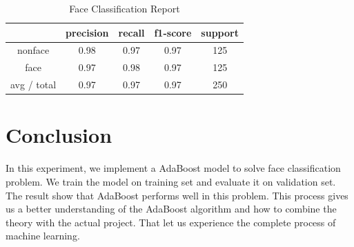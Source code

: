 \documentclass[journal, a4paper]{IEEEtran}
\begin{document}
	\begin{table}[!hbt]
		\begin{center}
		\caption{Face Classification Report}
		\label{tab:adaboost_report}
		\begin{tabular}{|c|c|c|c|c|}
			\hline
			  & precision & recall & f1-score & support \\
			\hline
			nonface & 0.98 & 0.97 & 0.97 & 125 \\
			\hline
			face & 0.97 & 0.98 & 0.97 & 125 \\
			\hline
			avg / total & 0.97 & 0.97 & 0.97 & 250\\
			\hline
		\end{tabular}
		\end{center}
	\end{table}




\section{Conclusion}
    In this experiment, we implement a AdaBoost model to solve face classification problem. We train the model on training set and evaluate it on validation set. The result show that AdaBoost performs well in this problem.
    This process gives us a better understanding of the AdaBoost algorithm and how to combine the theory with the actual project. That let us experience the complete process of machine learning.



\end{document}
